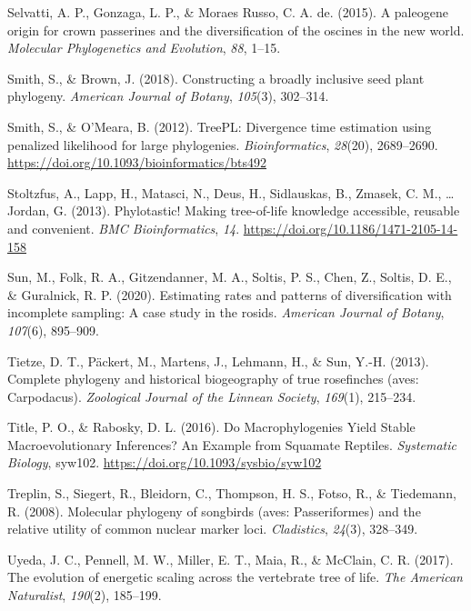 \documentclass[english,man]{apa6}
\begin{document}
\leavevmode\hypertarget{ref-selvatti2015paleogene}{}%
Selvatti, A. P., Gonzaga, L. P., \& Moraes Russo, C. A. de. (2015). A paleogene origin for crown passerines and the diversification of the oscines in the new world. \emph{Molecular Phylogenetics and Evolution}, \emph{88}, 1--15.

\leavevmode\hypertarget{ref-smith2018constructing}{}%
Smith, S., \& Brown, J. (2018). Constructing a broadly inclusive seed plant phylogeny. \emph{American Journal of Botany}, \emph{105}(3), 302--314.

\leavevmode\hypertarget{ref-Smith2012}{}%
Smith, S., \& O'Meara, B. (2012). TreePL: Divergence time estimation using penalized likelihood for large phylogenies. \emph{Bioinformatics}, \emph{28}(20), 2689--2690. \url{https://doi.org/10.1093/bioinformatics/bts492}

\leavevmode\hypertarget{ref-Stoltzfus2013}{}%
Stoltzfus, A., Lapp, H., Matasci, N., Deus, H., Sidlauskas, B., Zmasek, C. M., \ldots{} Jordan, G. (2013). Phylotastic! Making tree-of-life knowledge accessible, reusable and convenient. \emph{BMC Bioinformatics}, \emph{14}. \url{https://doi.org/10.1186/1471-2105-14-158}

\leavevmode\hypertarget{ref-sun2020estimating}{}%
Sun, M., Folk, R. A., Gitzendanner, M. A., Soltis, P. S., Chen, Z., Soltis, D. E., \& Guralnick, R. P. (2020). Estimating rates and patterns of diversification with incomplete sampling: A case study in the rosids. \emph{American Journal of Botany}, \emph{107}(6), 895--909.

\leavevmode\hypertarget{ref-tietze2013complete}{}%
Tietze, D. T., Päckert, M., Martens, J., Lehmann, H., \& Sun, Y.-H. (2013). Complete phylogeny and historical biogeography of true rosefinches (aves: Carpodacus). \emph{Zoological Journal of the Linnean Society}, \emph{169}(1), 215--234.

\leavevmode\hypertarget{ref-title2016macrophylogenies}{}%
Title, P. O., \& Rabosky, D. L. (2016). Do Macrophylogenies Yield Stable Macroevolutionary Inferences? An Example from Squamate Reptiles. \emph{Systematic Biology}, syw102. \url{https://doi.org/10.1093/sysbio/syw102}

\leavevmode\hypertarget{ref-treplin2008molecular}{}%
Treplin, S., Siegert, R., Bleidorn, C., Thompson, H. S., Fotso, R., \& Tiedemann, R. (2008). Molecular phylogeny of songbirds (aves: Passeriformes) and the relative utility of common nuclear marker loci. \emph{Cladistics}, \emph{24}(3), 328--349.

\leavevmode\hypertarget{ref-uyeda2017evolution}{}%
Uyeda, J. C., Pennell, M. W., Miller, E. T., Maia, R., \& McClain, C. R. (2017). The evolution of energetic scaling across the vertebrate tree of life. \emph{The American Naturalist}, \emph{190}(2), 185--199.
\end{document}
